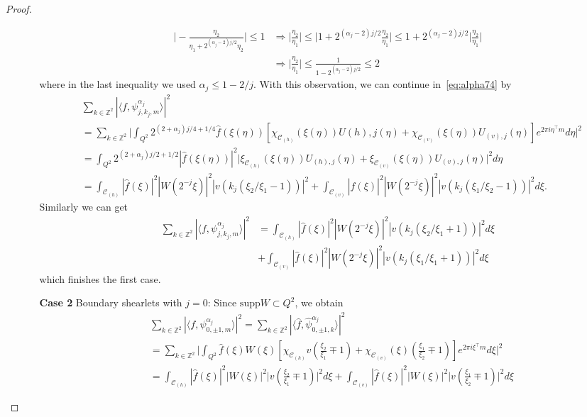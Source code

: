 \begin{proof}
\begin{itemize}
\begin{enumerate}
$$
\begin{aligned}
\big|-\frac{\eta_2}{\eta_1+2^{(\alpha_j-2)j/2}\eta_2}\bigg|\leq 1&\Longrightarrow \bigg|\frac{\eta_2}{\eta_1}\bigg|\leq \bigg| 1+2^{(\alpha_j-2)j/2}\frac{\eta_2}{\eta_1}\bigg|\leq 1+2^{(\alpha_j-2)j/2}\bigg|\frac{\eta_2}{\eta_1}\bigg|\\
&\Longrightarrow \bigg|\frac{\eta_2}{\eta_1}\bigg| \leq\frac{1}{1-2^{(\alpha_j-2)j/2}}\leq 2
\end{aligned}
$$
where in the last inequality we used $\alpha_j\leq 1-2/j$. With this observation, we can continue in~\ref{eq:alpha74} by
$$
\begin{aligned}
&\sum_{k\in\mathbb{Z}^2}|\langle f,\psi_{j,k_j,m}^{\alpha_j}\rangle|^2\\
&=\sum_{k\in\mathbb{Z}^2}\bigg|\int_{Q^2}2^{(2+\alpha_j)j/4+1/4}\hat{f}(\xi(\eta))\left[ \chi_{\mathcal{C}_{(h)}}(\xi(\eta))U{(h),j}(\eta)+\chi_{\mathcal{C}_{(v)}}(\xi(\eta))U_{(v),j}(\eta)\right]e^{2\pi i\eta^{\top}m}d\eta\bigg|^2\\
&=\int_{Q^2}2^{(2+\alpha_j)j/2+1/2}|\hat{f}(\xi(\eta))|^2\bigg|\xi_{\mathcal{C}_{(h)}}(\xi(\eta))U_{(h),j}(\eta)+\xi_{\mathcal{C}_{(v)}}(\xi(\eta))U_{(v),j}(\eta)\bigg|^2d\eta\\
&=\int_{\mathcal{C}_{(h)}}|\hat{f}(\xi)|^2|W(2^{-j}\xi)|^2|v(k_j(\xi_2/\xi_1-1))|^2+\int_{\mathcal{C}_{(v)}}|\hat{f}(\xi)|^2|W(2^{-j}\xi)|^2|v(k_j(\xi_1/\xi_2-1))|^2d\xi.
\end{aligned}
$$
Similarly we can get
$$
\begin{aligned}
\sum_{k\in\mathbb{Z}^2}|\langle f,\psi_{j,k_j,m}^{\alpha_j}\rangle|^2&=\int_{\mathcal{C}_{(h)}}|\hat{f}(\xi)|^2|W(2^{-j}\xi)|^2|v(k_j(\xi_2/\xi_1+1))|^2d\xi\\
&+\int_{\mathcal{C}_{(v)}}|\hat{f}(\xi)|^2|W(2^{-j}\xi)|^2|v(k_j(\xi_1/\xi_1+1))|^2d\xi
\end{aligned}
$$
which finishes the first case.

\item[\textbf{Case 2}] Boundary shearlets with $j=0$: Since $\text{supp}W\subset Q^2$, we obtain
$$
\begin{aligned}
&\sum_{k\in\mathbb{Z}^2}|\langle f,\psi_{0,\pm 1,m}^{\alpha_j}\rangle|^2=\sum_{k\in\mathbb{Z}^2}|\langle \hat{f},\hat{\psi}_{0,\pm 1,k}^{\alpha_j}\rangle|^2\\
&=\sum_{k\in\mathbb{Z}^2}\bigg|\int_{Q^2}\hat{f}(\xi)W(\xi)\left[\chi_{\mathcal{C}_{(h)}}v\left(\frac{\xi_2}{\xi_1}\mp 1\right) +\chi_{\mathcal{C}_{(v)}}(\xi)\left(\frac{\xi_1}{\xi_2}\mp 1\right)\right]e^{2\pi i\xi^{\top}m}d\xi\bigg|^2\\
&=\int_{\mathcal{C}_{(h)}}|\hat{f}(\xi)|^2|W(\xi)|^2\bigg| v\left(\frac{\xi_2}{\xi_1}\mp 1\right)\bigg|^2d\xi+\int_{\mathcal{C}_{(v)}}|\hat{f}(\xi)|^2|W(\xi)|^2\bigg|v\left(\frac{\xi_1}{\xi_2}\mp 1\right)\bigg|^2d\xi
\end{aligned}
$$


\end{enumerate}
\end{itemize}
\end{proof}
